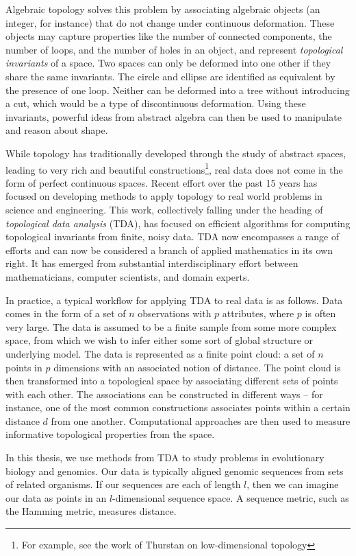 Algebraic topology solves this problem by associating algebraic objects (an integer, for instance) that do not change under continuous deformation.
These objects may capture properties like the number of connected components, the number of loops, and the number of holes in an object, and represent \emph{topological invariants} of a space.
Two spaces can only be deformed into one other if they share the same invariants.
The circle and ellipse are identified as equivalent by the presence of one loop.
Neither can be deformed into a tree without introducing a cut, which would be a type of discontinuous deformation.
Using these invariants, powerful ideas from abstract algebra can then be used to manipulate and reason about shape.

While topology has traditionally developed through the study of abstract spaces, leading to very rich and beautiful constructions\footnote{For example, see the work of Thurstan on low-dimensional topology}, real data does not come in the form of perfect continuous spaces.
Recent effort over the past 15 years has focused on developing methods to apply topology to real world problems in science and engineering.
This work, collectively falling under the heading of \emph{topological data analysis} (TDA), has focused on efficient algorithms for computing topological invariants from finite, noisy data.
TDA now encompasses a range of efforts and can now be considered a branch of applied mathematics in its own right.
It has emerged from substantial interdisciplinary effort between mathematicians, computer scientists, and domain experts.

In practice, a typical workflow for applying TDA to real data is as follows.
Data comes in the form of a set of $n$ observations with $p$ attributes, where $p$ is often very large.
The data is assumed to be a finite sample from some more complex space, from which we wish to infer either some sort of global structure or underlying model.
The data is represented as a finite point cloud: a set of $n$ points in $p$ dimensions with an associated notion of distance.
The point cloud is then transformed into a topological space by associating different sets of points with each other.
The associations can be constructed in different ways -- for instance, one of the most common constructions associates points within a certain distance $d$ from one another.
Computational approaches are then used to measure informative topological properties from the space.

In this thesis, we use methods from TDA to study problems in evolutionary biology and genomics.
Our data is typically aligned genomic sequences from sets of related organisms.
If our sequences are each of length $l$, then we can imagine our data as points in an $l$-dimensional sequence space.
A sequence metric, such as the Hamming metric, measures distance.

